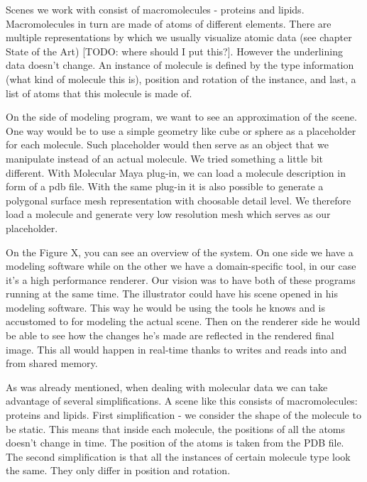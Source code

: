 \documentclass[
  digital, %
  table,   %
  nolof,     %
  nolot,     %
]{fithesis3}
\begin{document}
Scenes we work with consist of macromolecules - proteins and lipids. Macromolecules in turn are made of atoms of different elements. There are multiple representations by which we usually visualize atomic data (see chapter State of the Art) [TODO: where should I put this?]. However the underlining data doesn't change. An instance of molecule is defined by the type information (what kind of molecule this is), position and rotation of the instance, and last, a list of atoms that this molecule is made of.

On the side of modeling program, we want to see an approximation of the scene. One way would be to use a simple geometry like cube or sphere as a placeholder for each molecule. Such placeholder would then serve as an object that we manipulate instead of an actual molecule. We tried something a little bit different. With Molecular Maya plug-in, we can load a molecule description in form of a pdb file. With the same plug-in it is also possible to generate a polygonal surface mesh representation with choosable detail level. We therefore load a molecule and generate very low resolution mesh which serves as our placeholder.

On the Figure X, you can see an overview of the system. On one side we have a modeling software while on the other we have a domain-specific tool, in our case it's a high performance renderer. Our vision was to have both of these programs running at the same time. The illustrator could have his scene opened in his modeling software. This way he would be using the tools he knows and is accustomed to for modeling the actual scene. Then on the renderer side he would be able to see how the changes he's made are reflected in the rendered final image. This all would happen in real-time thanks to writes and reads into and from shared memory.

As was already mentioned, when dealing with molecular data we can take advantage of several simplifications. A scene like this consists of macromolecules: proteins and lipids. First simplification - we consider the shape of the molecule to be static. This means that inside each molecule, the positions of all the atoms doesn't change in time. The position of the atoms is taken from the PDB file. The second simplification is that all the instances of certain molecule type look the same. They only differ in position and rotation.
\end{document}

